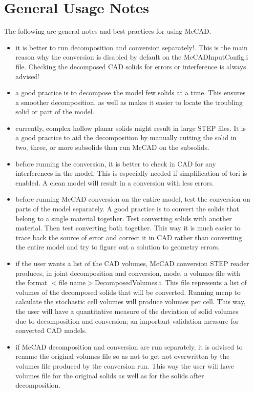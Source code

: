\documentclass[12pt, a4paper, titlepage]{article}
\begin{document}
\section{General Usage Notes} \label{sec:General Usage Notes}
The following are general notes and best practices for using McCAD.
\begin{itemize}
	\item it is better to run decomposition and conversion separately!. This is the main reason why the conversion is disabled by default on the McCADInputConfig.i file. Checking the decomposed CAD solids for errors or interference is always advised! 
	\item a good practice is to decompose the model few solids at a time. This ensures a smoother decomposition, as well as makes it easier to locate the troubling solid or part of the model.
	\item currently, complex hollow planar solids might result in large STEP files. It is a good practice to aid the decomposition by manually cutting the solid in two, three, or more subsolids then run McCAD on the subsolids.
	\item before running the conversion, it is better to check in CAD for any interferences in the model. This is especially needed if simplification of tori is enabled. A clean model will result in a conversion with less errors.
	\item before running McCAD conversion on the entire model, test the conversion on parts of the model separately. A good practice is to convert the solids that belong to a single material together. Test converting solids with another material. Then test converting both together. This way it is much easier to trace back the source of error and correct it in CAD rather than converting the entire model and try to figure out a solution to geometry errors.
	\item if the user wants a list of the CAD volumes, McCAD conversion STEP reader produces, in joint decomposition and conversion, mode, a volumes file with the format $<$file name$>$DecomposedVolumes.i. This file represents a list of volumes of the decomposed solids that will be converted. Running mcnp to calculate the stochastic cell volumes will produce volumes per cell. This way, the user will have a quantitative measure of the deviation of solid volumes due to decomposition and conversion; an important validation measure for converted CAD models.
	\item if McCAD decomposition and conversion are run separately, it is advised to rename the original volumes file so as not to get not overwritten by the volumes file produced by the conversion run. This way the user will have volumes file for the original solids as well as for the solids after decomposition.
\end{itemize}
\end{document}
